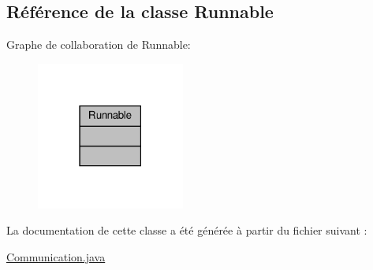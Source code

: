 \hypertarget{class_runnable}{}\subsection{Référence de la classe Runnable}
\label{class_runnable}


Graphe de collaboration de Runnable\+:
\nopagebreak
\begin{figure}[H]
\begin{center}
\leavevmode
\includegraphics[width=138pt]{class_runnable__coll__graph}
\end{center}
\end{figure}


La documentation de cette classe a été générée à partir du fichier suivant \+:\begin{DoxyCompactItemize}
\item 
\hyperlink{_communication_8java}{Communication.\+java}\end{DoxyCompactItemize}
